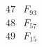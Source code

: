 \documentclass{article}
\begin{document}
{$$\begin{array}{|r|*{7}{r|}}
\\
\hline
47 
 &  F_{93}&
 & 
 & 
 & 
 & 
 & 
\\
\hline
48 
 & F_{57} &
 & 
 & 
 & 
 & 
 & 
\\
\hline
49 
 & F_{15} &
 & 
 & 
 & 

\end{array}$$}
\end{document}
